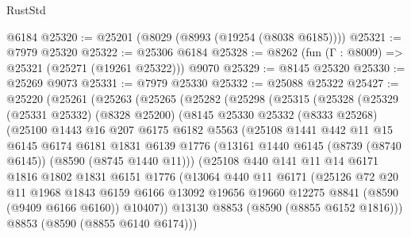 \begin{lexlean}{RustStd}
\begin{coremodule}
    @6184
@25320 := @25201 (@8029 (@8993 (@19254 (@8038 @6185))))
@25321 := @7979 @25320
@25322 := @25306 @6184
@25328 := @8262 (fun (Γ : @8009) => @25321 (@25271 (@19261 @25322))) @9070
@25329 := @8145 @25320
@25330 := @25269 @9073
@25331 := @7979 @25330
@25332 := @25088 @25322
@25427 := @25220
    (@25261
      (@25263
        (@25265
          (@25282
            (@25298
              (@25315
                (@25328
                  (@25329
                    (@25331 @25332)
                    (@8328 @25200)
                    (@8145
                      @25330
                      @25332
                      (@8333 @25268)
                      (@25100
                        @1443
                        @16
                        @207
                        @6175
                        @6182
                        @5563
                        (@25108
                          @1441
                          @442
                          @11
                          @15
                          @6145
                          @6174
                          @6181
                          @1831
                          @6139
                          @1776
                          (@13161 @1440 @6145 (@8739 (@8740 @6145)) (@8590 (@8745 @1440 @11)))
                          (@25108
                            @440
                            @141
                            @11
                            @14
                            @6171
                            @1816
                            @1802
                            @1831
                            @6151
                            @1776
                            (@13064
                              @440
                              @11
                              @6171
                              (@25126
                                @72
                                @20
                                @11
                                @1968
                                @1843
                                @6159
                                @6166
                                @13092
                                @19656
                                @19660
                                @12275
                                @8841
                                (@8590 (@9409 @6166 @6160))
                                @10407))
                            @13130
                            @8853
                            (@8590 (@8855 @6152 @1816)))
                          @8853
                          (@8590 (@8855 @6140 @6174)))

\end{coremodule}
\end{lexlean}

